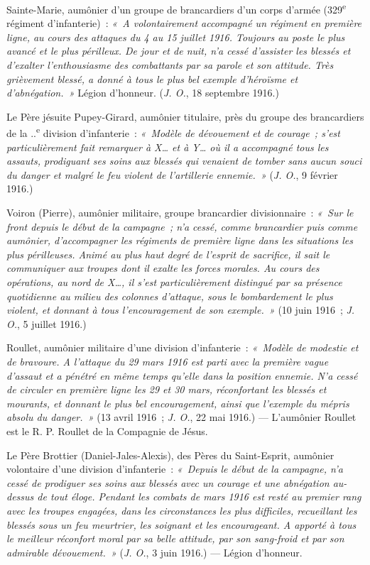 \documentclass[french,twoside]{book} %
\begin{document}
Sainte-Marie, aumônier d’un groupe de brancardiers d’un corps d’armée (329\textsuperscript{e} régiment d’infanterie) : \emph{« A volontairement accompagné un régiment en première ligne, au cours des attaques du 4 au 15 juillet 1916. Toujours au poste le plus avancé et le plus périlleux. De jour et de nuit, n’a cessé d’assister les blessés et d’exalter l’enthousiasme des combattants par sa parole et son attitude. Très grièvement blessé, a donné à tous le plus bel exemple d’héroïsme et d’abnégation. »} Légion d’honneur. ({\itshape J. O.}, 18 septembre 1916.)‌\par
Le Père jésuite Pupey-Girard, aumônier titulaire, près du groupe des brancardiers de la ..\textsuperscript{e} division d’infanterie : \emph{« Modèle de dévouement et de courage ; s’est particulièrement fait remarquer à X… et à Y… où il a accompagné tous les assauts, prodiguant ses soins aux blessés qui venaient de tomber sans aucun souci du danger et malgré le feu violent de l’artillerie ennemie. »} ({\itshape J. O.}, 9 février 1916.)‌\par
Voiron (Pierre), aumônier militaire, groupe brancardier divisionnaire : \emph{« Sur le front depuis le début de la campagne ; n’a cessé, comme brancardier puis comme aumônier, d’accompagner les régiments de première ligne dans les situations les plus périlleuses. Animé au plus haut degré de l’esprit de sacrifice, il sait le communiquer aux troupes dont il exalte les forces morales. Au cours des opérations, au nord de X…, il s’est particulièrement distingué par sa présence quotidienne au milieu des colonnes d’attaque, sous le bombardement le plus violent, et donnant à tous l’encouragement de son exemple. »} (10 juin 1916 ; {\itshape J. O.}, 5 juillet 1916.)‌\par
Roullet, aumônier militaire d’une division d’infanterie : \emph{« Modèle de modestie et de bravoure. A l’attaque du 29 mars 1916 est parti avec la première vague d’assaut et a pénétré en même temps qu’elle dans la position ennemie. N’a cessé de circuler en première ligne les 29 et 30 mars, réconfortant les blessés et mourants, et donnant le plus bel encouragement, ainsi que l’exemple du mépris absolu du danger. »} (13 avril 1916 ; {\itshape J. O.}, 22 mai 1916.) — L’aumônier Roullet est le R. P. Roullet de la Compagnie de Jésus.‌\par
Le Père Brottier (Daniel-Jales-Alexis), des Pères du Saint-Esprit, aumônier volontaire d’une division d’infanterie : \emph{« Depuis le début de la campagne, n’a cessé de prodiguer ses soins aux blessés avec un courage et une abnégation au-dessus de tout éloge. Pendant les combats de mars 1916 est resté au premier rang avec les troupes engagées, dans les circonstances les plus difficiles, recueillant les blessés sous un feu meurtrier, les soignant et les encourageant. A apporté à tous le meilleur réconfort moral par sa belle attitude, par son sang-froid et par son admirable dévouement. »} ({\itshape J. O.}, 3 juin 1916.) — Légion d’honneur.‌\par
\end{document}
